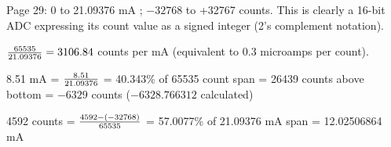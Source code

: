 \vskip 10pt

Page 29: 0 to 21.09376 mA ; $-32768$ to +32767 counts.  This is clearly a 16-bit ADC expressing its count value as a signed integer (2's complement notation).

\vskip 10pt

${65535 \over 21.09376}= 3106.84$ counts per mA (equivalent to 0.3 microamps per count).

\vskip 10pt

8.51 mA = ${8.51 \over 21.09376}$ = 40.343\% of 65535 count span = 26439 counts above bottom = $-6329$ counts ($-6328.766312$ calculated)

\vskip 10pt

4592 counts = ${4592 - (-32768) \over 65535}$ = 57.0077\% of 21.09376 mA span = 12.02506864 mA



